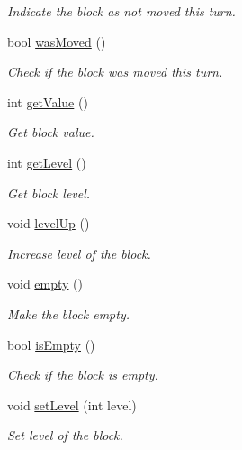 \begin{DoxyCompactItemize}
\begin{DoxyCompactList}\small\item\em Indicate the block as not moved this turn. \end{DoxyCompactList}\item 
bool \hyperlink{class_nulocks_1_1_core_1_1_block_a5c1d270d8bca8d1c0ca67ef950086f32}{was\-Moved} ()
\begin{DoxyCompactList}\small\item\em Check if the block was moved this turn. \end{DoxyCompactList}\item 
int \hyperlink{class_nulocks_1_1_core_1_1_block_a989dc6c96dde5da694fcdbb936cffee0}{get\-Value} ()
\begin{DoxyCompactList}\small\item\em Get block value. \end{DoxyCompactList}\item 
int \hyperlink{class_nulocks_1_1_core_1_1_block_ad60ea0ef64de5e639afc25d7c17f2f30}{get\-Level} ()
\begin{DoxyCompactList}\small\item\em Get block level. \end{DoxyCompactList}\item 
\hypertarget{class_nulocks_1_1_core_1_1_block_ad7aad0498de7491795c8be1d18c18a56}{void \hyperlink{class_nulocks_1_1_core_1_1_block_ad7aad0498de7491795c8be1d18c18a56}{level\-Up} ()}\label{class_nulocks_1_1_core_1_1_block_ad7aad0498de7491795c8be1d18c18a56}

\begin{DoxyCompactList}\small\item\em Increase level of the block. \end{DoxyCompactList}\item 
\hypertarget{class_nulocks_1_1_core_1_1_block_a3a6aa3d4002605f9d0fd1e51dbe0e0c8}{void \hyperlink{class_nulocks_1_1_core_1_1_block_a3a6aa3d4002605f9d0fd1e51dbe0e0c8}{empty} ()}\label{class_nulocks_1_1_core_1_1_block_a3a6aa3d4002605f9d0fd1e51dbe0e0c8}

\begin{DoxyCompactList}\small\item\em Make the block empty. \end{DoxyCompactList}\item 
bool \hyperlink{class_nulocks_1_1_core_1_1_block_ab366a04c5fd4163b5e8bc90a48bf240d}{is\-Empty} ()
\begin{DoxyCompactList}\small\item\em Check if the block is empty. \end{DoxyCompactList}\item 
void \hyperlink{class_nulocks_1_1_core_1_1_block_ae91c1731e6b60af9adeff1e7c58a17ef}{set\-Level} (int level)
\begin{DoxyCompactList}\small\item\em Set level of the block. \end{DoxyCompactList}\end{DoxyCompactItemize}


